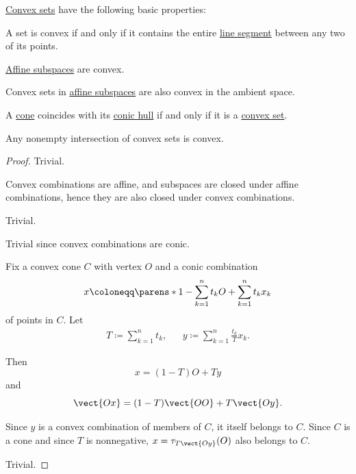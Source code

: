 \begin{proposition}\label{thm:def:convex_hull}
  \hyperref[def:convex_hull]{Convex sets} have the following basic properties:

  \begin{thmenum}
     A set is convex if and only if it contains the entire \hyperref[def:line_segment]{line segment} between any two of its points.

     \hyperref[def:affine_subspace]{Affine subspaces} are convex.

     Convex sets in \hyperref[def:affine_subspace]{affine subspaces} are also convex in the ambient space.

     A \hyperref[def:geometric_cone]{cone} coincides with its \hyperref[def:convex_hull]{conic hull} if and only if it is a \hyperref[def:convex_hull]{convex set}.

     Any nonempty intersection of convex sets is convex.
  \end{thmenum}
\end{proposition}
\begin{proof}
   Trivial.

   Convex combinations are affine, and subspaces are closed under affine combinations, hence they are also closed under convex combinations.

   Trivial.

  \SufficiencySubProof* Trivial since convex combinations are conic.

  \NecessitySubProof* Fix a convex cone \( C \) with vertex \( O \) and a conic combination
  \begin{equation*}
    x \coloneqq \parens*{ 1 - \sum_{k=1}^n t_k } O + \sum_{k=1}^n t_k x_k
  \end{equation*}
  of points in \( C \). Let
  \begin{align*}
    T \coloneqq \sum_{k=1}^n t_k,
    &&
    y \coloneqq \sum_{k=1}^n \frac {t_k} T x_k.
  \end{align*}

  Then
  \begin{equation*}
    x = (1 - T) O + T y
  \end{equation*}
  and
  \begin{equation*}
    \vect{Ox} = (1 - T) \vect{OO} + T \vect{Oy}.
  \end{equation*}

  Since \( y \) is a convex combination of members of \( C \), it itself belongs to \( C \). Since \( C \) is a cone and since \( T \) is nonnegative, \( x = \tau_{T \vect{Oy}}(O) \) also belongs to \( C \).

   Trivial.
\end{proof}

